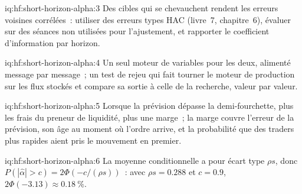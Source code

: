 \begin{solution}{iq:hf:short-horizon-alpha:3}
Des cibles qui se chevauchent rendent les erreurs voisines corrélées~: utiliser des erreurs types HAC (livre~7, chapitre~6), évaluer sur des séances non utilisées pour
l'ajustement, et rapporter le coefficient d'information par horizon.
\end{solution}

\begin{solution}{iq:hf:short-horizon-alpha:4}
Un seul moteur de variables pour les deux, alimenté message par message~; un test de rejeu qui fait tourner le moteur de production sur les flux stockés et compare sa sortie à
celle de la recherche, valeur par valeur.
\end{solution}

\begin{solution}{iq:hf:short-horizon-alpha:5}
Lorsque la prévision dépasse la demi-fourchette, plus les frais du preneur de liquidité, plus une marge~; la marge couvre l'erreur de la prévision, son âge au moment où l'ordre
arrive, et la probabilité que des traders plus rapides aient pris le mouvement en premier.
\end{solution}

\begin{solution}{iq:hf:short-horizon-alpha:6}
La moyenne conditionnelle a pour écart type $\rho s$, donc $P(|\hat\alpha|>c)=2\Phi(-c/(\rho s))$~: avec $\rho s=0.288$ et $c=0.9$, $2\Phi(-3.13)
\approx0.18~\%$.
\end{solution}
